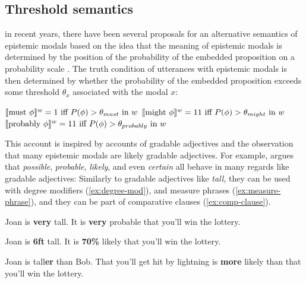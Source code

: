 \subsection{Threshold semantics}

in recent years, there have been several proposals for an alternative semantics of epistemic modals based on the idea that the meaning of 
epistemic modals is determined by the position of the probability of the embedded proposition on a probability scale
\cite{e.g., Swanson2006,Yalcin2010,Lassiter2017}. The truth condition of utterances with epistemic modals is then determined by whether
the probability of the embedded proposition exceeds some threshold $\theta_x$ associated with the modal $x$:

\begin{exe}
\ex $\llbracket\mbox{must }\phi\rrbracket^{w} = 1 \mbox{ iff $P(\phi) > \theta_{must}$ in $w$} $
\ex $\llbracket\mbox{might } \phi\rrbracket^{w} = 11 \mbox{ iff $P(\phi) > \theta_{might}$ in $w$} $
\ex $\llbracket\mbox{probably } \phi\rrbracket^{w} = 11 \mbox{ iff $P(\phi) > \theta_{probably}$ in $w$} $
\end{exe}

This account is inspired by accounts of gradable adjectives \cite{e.g., Kennedy2007} and the observation that many 
epistemic modals are likely gradable adjectives. For example, \cite{Lassiter2017} argues that \textit{possible}, \textit{probable},
\textit{likely}, and even \textit{certain} all behave in many regards like gradable adjectives: Similarly to gradable adjectives like \textit{tall}, 
they can be used with degree modifiers  (\ref{ex:degree-mod}), and measure phrases (\ref{ex:measure-phrase}), and they can be part of comparative clauses (\ref{ex:comp-clause}).

\begin{exe}
\ex \label{ex:degree-mod} \begin{xlist}
\ex Joan is \textbf{very} tall.
\ex It is \textbf{very} probable that you'll win the lottery.
\end{xlist}
\ex \label{ex:measure-phrase} \begin{xlist}
\ex Joan is \textbf{6ft} tall.
\ex It is \textbf{70\%} likely that you'll win the lottery.
\end{xlist}
\ex  \label{ex:comp-clause}  \begin{xlist}
\ex Joan is tall\textbf{er} than Bob.
\ex That you'll get hit by lightning is \textbf{more} likely than that you'll win the lottery.
\end{xlist}
\end{exe}

